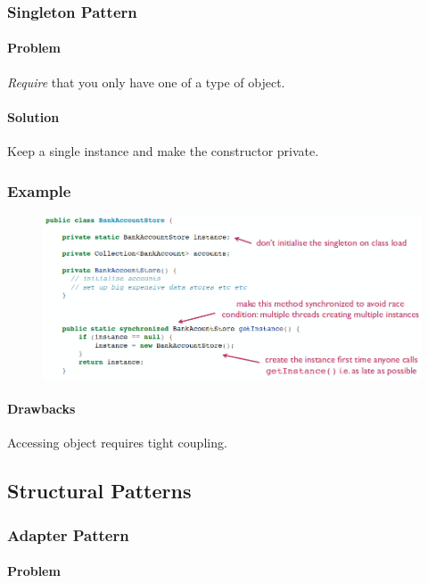 \documentclass[twocolumn,english]{article}
\begin{document}
\subsubsection{Singleton Pattern}

\paragraph{Problem}

\emph{Require} that you only have one of a type of object.

\paragraph{Solution}

Keep a single instance and make the constructor private.

\subsubsection*{Example}

\begin{figure}[H]
\centering{}\includegraphics[width=0.6\columnwidth]{img/singleton}
\end{figure}

\paragraph{Drawbacks}

Accessing object requires tight coupling.

\subsection{Structural Patterns}

\subsubsection{Adapter Pattern}

\paragraph{Problem}
\end{document}
